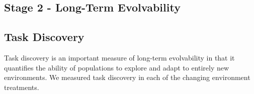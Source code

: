 \documentclass[10pt,letterpaper,final]{article}
\begin{document}

\subsection*{Stage 2 - Long-Term Evolvability}
\subsection*{Task Discovery}
Task discovery is an important measure of long-term evolvability in that it quantifies the ability of populations to explore and adapt to entirely new environments. We measured task discovery in each of the changing environment treatments.
\end{document}
